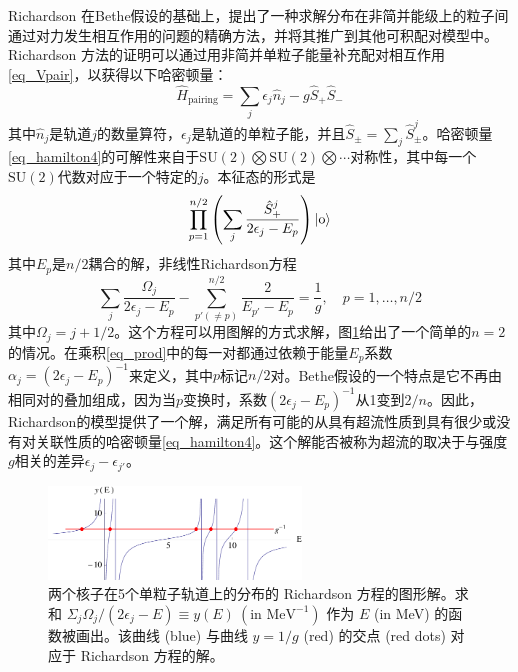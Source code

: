 Richardson 在Bethe假设的基础上，提出了一种求解分布在非简并能级上的粒子间通过对力发生相互作用的问题的精确方法，并将其推广到其他可积配对模型中。Richardson 方法的证明可以通过用非简并单粒子能量补充配对相互作用\ref{eq_Vpair}，以获得以下哈密顿量：
\begin{equation}\label{eq_hamilton4}
\hat{H}_\textrm{pairing}=\sum_j\epsilon_j\hat{n}_j-g\hat{S}_+\hat{S}_-
\end{equation}
其中$\hat{n}_j$是轨道$j$的数量算符，$\epsilon_j$是轨道的单粒子能，并且$\hat{S}_\pm=\sum_j\hat{S}^j_\pm$。哈密顿量\ref{eq_hamilton4}的可解性来自于$\textrm{SU}(2)\bigotimes\textrm{SU}(2)\bigotimes\cdots$对称性，其中每一个$\textrm{SU}(2)$代数对应于一个特定的$j$。本征态的形式是
\begin{equation}\label{eq_prod}
\prod_{p=1}^{n/2}\left(\sum_j\frac{\hat{S}_+^j}{2\epsilon_j-E_p}\right)|{\rm o}\rangle
\end{equation}
其中$E_p$是$n/2$耦合的解，非线性Richardson方程
\begin{equation}
\sum_j\frac{\Omega_j}{2\epsilon_j-E_p}-\sum_{p'(\ne p)}^{n/2}\frac{2}{E_{p'}-E_p}=\frac{1}{g},\quad p=1,\ldots,n/2
\end{equation}
其中$\Omega_j=j+1/2$。这个方程可以用图解的方式求解，图\ref{F_richardson}给出了一个简单的$n=2$的情况。在乘积\ref{eq_prod}中的每一对都通过依赖于能量$E_p$系数$\alpha_j=(2\epsilon_j-E_p)^{-1}$来定义，其中$p$标记$n/2$对。Bethe假设的一个特点是它不再由相同对的叠加组成，因为当$p$变换时，系数$(2\epsilon_j-E_p)^{-1}$从1变到$2/n$。因此，Richardson的模型提供了一个解，满足所有可能的从具有超流性质到具有很少或没有对关联性质的哈密顿量\ref{eq_hamilton4}。这个解能否被称为超流的取决于与强度$g$相关的差异$\epsilon_j-\epsilon_{j'}$。
\begin{figure}[H]
\centering
\includegraphics[width=0.6\textwidth]{figure/F_richardson.png}
\caption{两个核子在5个单粒子轨道上的分布的 Richardson 方程的图形解。求和 $\Sigma_j\Omega_j/(2\epsilon_j-E)\equiv y(E)\ (\textrm{in MeV}^{-1})$ 作为 $E$ (in MeV) 的函数被画出。该曲线 (blue) 与曲线 ${y=1/g}$ (red) 的交点 (red dots) 对应于 Richardson 方程的解。\label{F_richardson}}
\end{figure}


